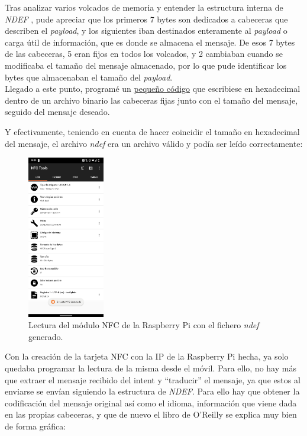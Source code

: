 Tras analizar varios volcados de memoria y entender la estructura interna de
\emph{NDEF} \cite{ndef-explicado}, pude apreciar que los primeros 7 bytes son
dedicados a cabeceras que describen el \emph{payload}, y los siguientes iban
destinados enteramente al \emph{payload} o carga útil de información, que es
donde se almacena el mensaje. De esos 7 bytes de las cabeceras, 5 eran fijos en
todos los volcados, y 2 cambiaban cuando se modificaba el tamaño del mensaje
almacenado, por lo que pude identificar los bytes que almacenaban el tamaño del
\emph{payload}.\\

Llegado a este punto, programé un \hyperref[codigo_ndef]{pequeño código} que
escribiese en hexadecimal dentro de un archivo binario las cabeceras fijas junto
con el tamaño del mensaje, seguido del mensaje deseado. 

Y efectivamente, teniendo en cuenta de hacer coincidir el tamaño en hexadecimal
del mensaje, el archivo \emph{ndef} era un archivo válido y podía ser leído correctamente:

\begin{figure}[h!]
    \centering
    \includegraphics[width=0.3\textwidth]{fotos/lectura_raspberry.png}
    \caption{Lectura del módulo NFC de la Raspberry Pi con el fichero \emph{ndef} generado.}
\end{figure}

Con la creación de la tarjeta NFC con la IP de la Raspberry Pi hecha, ya solo
quedaba programar la lectura de la misma desde el móvil. Para ello, no hay más
que extraer el mensaje recibido del intent y ``traducir'' el mensaje, ya que
estos al enviarse se envían siguiendo la estructura de \emph{NDEF}. Para ello
hay que obtener la codificación del mensaje original así como el idioma,
información que viene dada en las propias cabeceras, y que de nuevo el libro de
O'Reilly \cite{ndef-explicado} se explica muy bien de forma gráfica:

